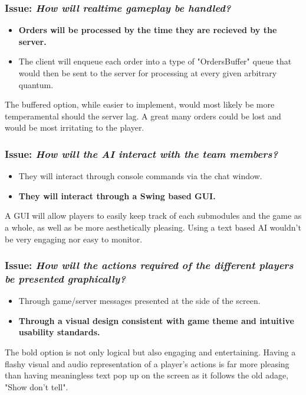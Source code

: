 \subsubsection*{Issue: \textit{How will realtime gameplay be handled?}}

  \begin{itemize}
    \item \textbf{Orders will be processed by the time they are recieved by the server.}
    \item The client will enqueue each order into a type of "OrdersBuffer" queue that would then be sent to the server for processing at every given arbitrary quantum.
  \end{itemize}

The buffered option, while easier to implement, would most likely be more temperamental should the server lag. A great many orders could be lost and would be most irritating to the player.

\subsubsection*{Issue: \textit{How will the AI interact with the team members?}}

  \begin{itemize}
    \item They will interact through console commands via the chat window.
    \item \textbf{They will interact through a Swing based GUI.}
  \end{itemize}

A GUI will allow players to easily keep track of each submodules and the game as a whole, as well as be more aesthetically pleasing. Using a text based AI wouldn't be very engaging nor easy to monitor.

\subsubsection*{Issue: \textit{How will the actions required of the different players be presented graphically?}}

  \begin{itemize}
    \item Through game/server messages presented at the side of the screen.
    \item \textbf{Through a visual design consistent with game theme and intuitive usability standards.}
  \end{itemize}

The bold option is not only logical but also engaging and entertaining. Having a flashy visual and audio representation of a player's actions is far more pleasing than having meaningless text pop up on the screen as it follows the old adage, "Show don't tell".
